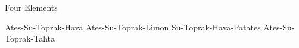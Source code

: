 \documentclass{exam}
\begin{document}
\begin{questions}
\question Four Elements\newline
\begin{oneparchoices}
\choice Ates-Su-Toprak-Hava
\choice Ates-Su-Toprak-Limon
\choice Su-Toprak-Hava-Patates
\choice Ates-Su-Toprak-Tahta
\end{oneparchoices}
\end{questions}
\end{document}
